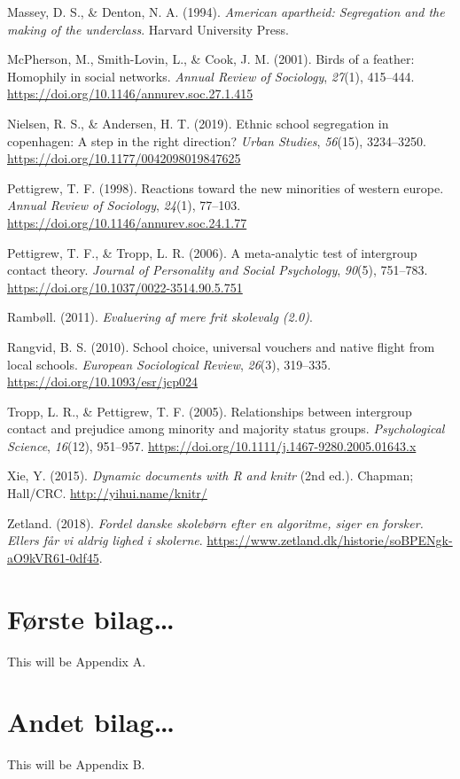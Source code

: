 \documentclass[
]{book}
\newlength{\cslhangindent}
\newenvironment{CSLReferences}[2] %
 {\begin{list}{}{%
  \setlength{\itemindent}{0pt}
  \setlength{\leftmargin}{0pt}
  \setlength{\parsep}{0pt}
  \ifodd #1
   \setlength{\leftmargin}{\cslhangindent}
   \setlength{\itemindent}{-1\cslhangindent}
  \fi
  \setlength{\itemsep}{#2\baselineskip}}}
 {\end{list}}
\begin{document}
\begin{CSLReferences}{1}{0}
Massey, D. S., \& Denton, N. A. (1994). \emph{American apartheid: Segregation and the making of the underclass}. Harvard University Press.

McPherson, M., Smith-Lovin, L., \& Cook, J. M. (2001). Birds of a feather: Homophily in social networks. \emph{Annual Review of Sociology}, \emph{27}(1), 415--444. \url{https://doi.org/10.1146/annurev.soc.27.1.415}

Nielsen, R. S., \& Andersen, H. T. (2019). Ethnic school segregation in copenhagen: A step in the right direction? \emph{Urban Studies}, \emph{56}(15), 3234--3250. \url{https://doi.org/10.1177/0042098019847625}

Pettigrew, T. F. (1998). Reactions toward the new minorities of western europe. \emph{Annual Review of Sociology}, \emph{24}(1), 77--103. \url{https://doi.org/10.1146/annurev.soc.24.1.77}

Pettigrew, T. F., \& Tropp, L. R. (2006). A meta-analytic test of intergroup contact theory. \emph{Journal of Personality and Social Psychology}, \emph{90}(5), 751--783. \url{https://doi.org/10.1037/0022-3514.90.5.751}

Rambøll. (2011). \emph{Evaluering af mere frit skolevalg (2.0)}.

Rangvid, B. S. (2010). School choice, universal vouchers and native flight from local schools. \emph{European Sociological Review}, \emph{26}(3), 319--335. \url{https://doi.org/10.1093/esr/jcp024}

Tropp, L. R., \& Pettigrew, T. F. (2005). Relationships between intergroup contact and prejudice among minority and majority status groups. \emph{Psychological Science}, \emph{16}(12), 951--957. \url{https://doi.org/10.1111/j.1467-9280.2005.01643.x}

Xie, Y. (2015). \emph{Dynamic documents with {R} and knitr} (2nd ed.). Chapman; Hall/CRC. \url{http://yihui.name/knitr/}

Zetland. (2018). \emph{Fordel danske skolebørn efter en algoritme, siger en forsker. Ellers får vi aldrig lighed i skolerne}. \url{https://www.zetland.dk/historie/soBPENgk-aO9kVR61-0df45}.

\end{CSLReferences}

\appendix


\chapter{Første bilag\ldots{}}\label{bilag1}

This will be Appendix A.

\chapter{Andet bilag\ldots{}}\label{bilag2}

This will be Appendix B.
\end{document}
